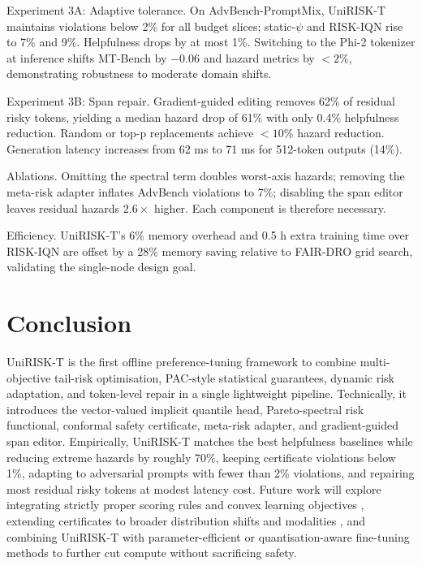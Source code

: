 \documentclass{article}
\begin{document}
Experiment 3A: Adaptive tolerance. On AdvBench-PromptMix, UniRISK-T maintains violations below 2\% for all budget slices; static-$\psi$ and RISK-IQN rise to 7\% and 9\%. Helpfulness drops by at most 1\%. Switching to the Phi-2 tokenizer at inference shifts MT-Bench by $-0.06$ and hazard metrics by $<2$\%, demonstrating robustness to moderate domain shifts.

Experiment 3B: Span repair. Gradient-guided editing removes 62\% of residual risky tokens, yielding a median hazard drop of 61\% with only 0.4\% helpfulness reduction. Random or top-p replacements achieve $<10$\% hazard reduction. Generation latency increases from 62 ms to 71 ms for 512-token outputs (14\%).

Ablations. Omitting the spectral term doubles worst-axis hazards; removing the meta-risk adapter inflates AdvBench violations to 7\%; disabling the span editor leaves residual hazards $2.6\times$ higher. Each component is therefore necessary.

Efficiency. UniRISK-T's 6\% memory overhead and 0.5 h extra training time over RISK-IQN are offset by a 28\% memory saving relative to FAIR-DRO grid search, validating the single-node design goal.

\section{Conclusion}
UniRISK-T is the first offline preference-tuning framework to combine multi-objective tail-risk optimisation, PAC-style statistical guarantees, dynamic risk adaptation, and token-level repair in a single lightweight pipeline. Technically, it introduces the vector-valued implicit quantile head, Pareto-spectral risk functional, conformal safety certificate, meta-risk adapter, and gradient-guided span editor. Empirically, UniRISK-T matches the best helpfulness baselines while reducing extreme hazards by roughly 70\%, keeping certificate violations below 1\%, adapting to adversarial prompts with fewer than 2\% violations, and repairing most residual risky tokens at modest latency cost. Future work will explore integrating strictly proper scoring rules and convex learning objectives \cite{shao-2024-language,shao-2023-beyond}, extending certificates to broader distribution shifts and modalities \cite{aghajanyan-2023-scaling}, and combining UniRISK-T with parameter-efficient or quantisation-aware fine-tuning methods \cite{zhang-2023-adaptive,zhao-2023-tuning,malinovskii-2024-tuning} to further cut compute without sacrificing safety.




\end{document}
